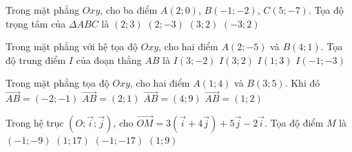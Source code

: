 

\begin{ex}%
	Trong mặt phẳng $Oxy$, cho ba điểm $A(2;0)$, $B(-1;-2)$, $C(5;-7)$. Tọa độ trọng tâm của $\Delta ABC$  là
	 \choice
		 {$(2;3)$}
		{\True  $(2;-3)$}
		{$(3;2)$} 
		 {$(-3;2)$}
\end{ex}

\begin{ex}%
	Trong mặt phẳng với hệ tọa độ $Oxy$, cho hai điểm $A(2;-5)$ và $B(4;1)$. Tọa độ trung điểm $I$ của đoạn thẳng  $AB$ là
	\choice 
		 {\True $I(3;-2)$}
		 {$I(3;2)$}
		{$I(1;3)$} 
		{$I(-1;-3)$} 
\end{ex}

\begin{ex}%
	Trong mặt phẳng tọa độ $Oxy$,  cho hai điểm $A(1;4)$ và $B(3;5)$. Khi đó
	\choice 
		 {$\overrightarrow{AB}=(-2;-1)$}
		{\True $\overrightarrow{AB}=(2;1)$} 
		{$\overrightarrow{AB}=(4;9)$} 
		 {$\overrightarrow{AB}=(1;2)$}
\end{ex}

\begin{ex}%
	Trong hệ trục $\left(O;\overrightarrow{i};\overrightarrow{j}\right)$, cho $\overrightarrow{OM}=3\left(\overrightarrow{i}+4\overrightarrow{j}\right)+5\overrightarrow{j}-2\overrightarrow{i}$. Tọa độ  điểm $M$ là
	\choice 
		{$(-1;-9)$} 
		 {\True $(1;17)$}
		 {$(-1;-17)$}
		 {$(1;9)$}
\end{ex}

